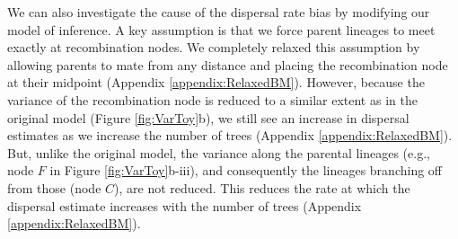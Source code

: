 We can also investigate the cause of the dispersal rate bias by modifying our model of inference. A key assumption is that we force parent lineages to meet exactly at recombination nodes. We completely relaxed this assumption by allowing parents to mate from any distance and placing the recombination node at their midpoint (Appendix \ref{appendix:RelaxedBM}). However, because the variance of the recombination node is reduced to a similar extent as in the original model (Figure \ref{fig:VarToy}b), we still see an increase in dispersal estimates as we increase the number of trees (Appendix \ref{appendix:RelaxedBM}). But, unlike the original model, the variance along the parental lineages (e.g., node $F$ in Figure \ref{fig:VarToy}b-iii), and consequently the lineages branching off from those (node $C$), are not reduced. This reduces the rate at which the dispersal estimate increases with the number of trees (Appendix \ref{appendix:RelaxedBM}).


